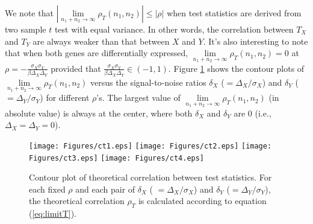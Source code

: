 \documentclass[12pt, a4paper]{article}
\newcommand{\DED}{differentially expressed}
\begin{document}
%			

We note that $|\lim\limits_{n_1 + n_2 \rightarrow \infty} \rho_T(n_1, n_2)| \leq |\rho|$ when test 
statistics are derived from two sample $t$ test 
with equal variance. In other words, the correlation between $T_X$ and $T_Y$ are always weaker
than that between $X$ 
and $Y$. It's also interesting to note that when both genes are \DED, $\lim\limits_{n_1 + n_2 
	\rightarrow \infty} \rho_T(n_1, n_2)=0$ at $\rho 
=-\frac{\sigma_X\sigma_Y}{\beta\Delta_X\Delta_Y} $ provided that
$\frac{\sigma_X\sigma_Y}{\beta\Delta_X\Delta_Y} \in (-1, 1)$. Figure \ref{fig:ct} shows the 
contour plots of $\lim\limits_{n_1 + n_2 \rightarrow \infty} \rho_T(n_1, n_2)$ versus the 
signal-to-noise ratios $\delta_X$ ($=\Delta_X/\sigma_X$) 
and $\delta_Y$ ($=\Delta_Y/\sigma_Y$) for different $\rho$'s. The largest value of 
$\lim\limits_{n_1 + n_2 \rightarrow \infty} \rho_T(n_1, n_2)$ (in 
absolute value) 
is always at the center, where both $\delta_X$ and $\delta_Y$ are 0 (i.e., $\Delta_X =\Delta_Y 
= 0$).

\begin{figure}[!ht]
	\centering
	\texttt{[image: Figures/ct1.eps]}
	\texttt{[image: Figures/ct2.eps]}
	\texttt{[image: Figures/ct3.eps]}
	\texttt{[image: Figures/ct4.eps]}
	\caption[Contour plot of theoretical correlation between test statistics.]{Contour plot of 
		theoretical correlation between test statistics. For 
		each fixed $\rho$ and each pair of $\delta_X$ (	$=\Delta_X/\sigma_X$) 
		and $\delta_Y$ ($=\Delta_Y/\sigma_Y$), the theoretical correlation $\rho_T$ is 
		calculated according to equation (\ref{eq:limitT}).}
	\label{fig:ct}
\end{figure}
\end{document}
